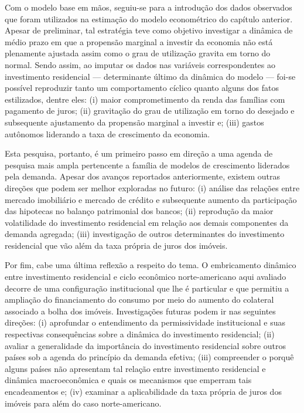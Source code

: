 
Com o modelo base em mãos, seguiu-se para a introdução dos dados observados que foram utilizados na estimação do modelo econométrico do capítulo anterior.
Apesar de preliminar, tal estratégia teve como objetivo investigar a dinâmica de médio prazo em que a propensão marginal a investir da economia não está plenamente ajustada assim como o grau de utilização gravita em torno do normal.
Sendo assim, ao imputar os dados nas variáveis correspondentes ao investimento residencial --- determinante último da dinâmica do modelo --- foi-se possível reproduzir tanto um comportamento cíclico quanto alguns dos fatos estilizados, dentre eles: (i) maior comprometimento da renda das famílias com pagamento de juros; (ii) gravitação do grau de utilização em torno do desejado e subsequente ajustamento da propensão marginal a investir e; (iii) gastos autônomos liderando a taxa de crescimento da economia.


Esta pesquisa, portanto, é um primeiro passo em direção a uma agenda de pesquisa mais ampla pertencente a família de modelos de crescimento liderados pela demanda.
Apesar dos avanços reportados anteriormente, existem outras direções que podem ser melhor exploradas no futuro: (i) análise das relações entre mercado imobiliário e mercado de crédito e subsequente aumento da participação das hipotecas no balanço patrimonial dos bancos; (ii) reprodução da maior volatilidade do investimento residencial em relação aos demais componentes da demanda agregada; (iii) investigação de outros determinantes do investimento residencial que vão além da taxa própria de juros dos imóveis.

Por fim, cabe uma última reflexão a respeito do tema.
O embricamento dinâmico entre investimento residencial e ciclo econômico norte-americano aqui avaliado decorre de uma configuração institucional que lhe é particular e que permitiu a ampliação do financiamento do consumo por meio do aumento do colateral associado a bolha dos imóveis.
Investigações futuras podem ir nas seguintes direções:
	(i) aprofundar o entendimento da permissividade institucional e suas respectivas consequências sobre a dinâmica do investimento residencial; 
	(ii) avaliar a generalidade da importância do investimento residencial sobre outros países sob a agenda do princípio da demanda efetiva;
	(iii) compreender o porquê alguns países não apresentam tal relação entre investimento residencial e dinâmica macroeconômica e quais os mecanismos que emperram tais encadeamentos e;
	(iv) examinar a aplicabilidade da taxa própria de juros dos imóveis para além do caso norte-americano.